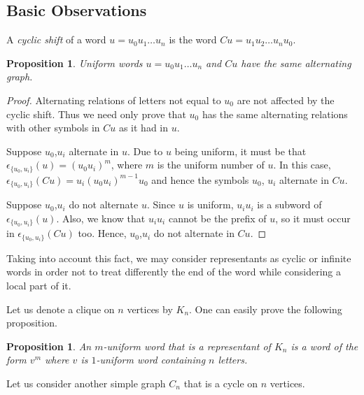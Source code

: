 \documentclass[12pt]{article}
\newtheorem{proposition}[theorem]{Proposition}
\begin{document}
\subsection{Basic Observations}
A \emph{cyclic shift} of a word $u=u_0u_1\ldots u_n$ is the word $Cu=u_1u_2\ldots u_nu_0$.
\begin{proposition}\label{pCShift} Uniform words $u=u_0u_1\ldots u_n$ and $Cu$ have the same alternating graph.
\end{proposition}
\begin{proof} Alternating relations of letters not equal to $u_0$ are not affected by the cyclic shift. Thus we need only prove that $u_0$ has the same alternating relations with other symbols in $Cu$ as it had in $u$.

Suppose $u_0$,$u_i$ alternate in $u$. Due to $u$ being uniform, it must be that $\epsilon_{\{u_0,u_i\}}(u)=(u_0u_i)^m$, where $m$ is the uniform number of $u$. In this case, $\epsilon_{\{u_0,u_i\}}(Cu)=u_i(u_0u_i)^{m-1}u_0$ and hence the symbols $u_0$, $u_i$ alternate in $Cu$.

Suppose $u_0$,$u_i$ do not alternate $u$. Since $u$ is uniform, $u_iu_i$ is a subword of $\epsilon_{\{u_0,u_i\}}(u)$. Also, we know that $u_iu_i$ cannot be the prefix of $u$, so it must occur in $\epsilon_{\{u_0,u_i\}}(Cu)$ too. Hence, $u_0$,$u_i$ do not alternate in $Cu$.
\end{proof}

Taking into account this fact, we may consider representants as cyclic or infinite words in order not to treat differently the end of the word while considering a local part of it.


Let us denote a clique on $n$ vertices by $K_n$. One can easily prove the following proposition.

\begin{proposition}\label{pCliqueRep} An $m$-uniform word that is a representant of $K_{n}$ is a word of the form $v^m$ where $v$ is $1$-uniform word containing $n$ letters.
\end{proposition}

Let us consider another simple graph $C_{n}$ that is a cycle on $n$ vertices.
\end{document}
